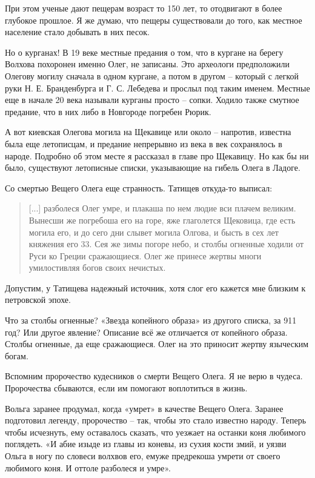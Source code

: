 При этом ученые дают пещерам возраст то 150 лет, то отодвигают в более глубокое прошлое. Я же думаю, что пещеры существовали до того, как местное население стало добывать в них песок. 

Но о курганах! В 19 веке местные предания о том, что в кургане на берегу Волхова похоронен именно Олег, не записаны. Это археологи предположили Олегову могилу сначала в одном кургане, а потом в другом – который с легкой руки Н. Е. Бранденбурга и Г. С. Лебедева и прослыл под таким именем. Местные еще в начале 20 века называли курганы просто – сопки. Ходило также смутное предание, что в них либо в Новгороде погребен Рюрик.

А вот киевская Олегова могила на Щекавице или около – напротив, известна была еще летописцам, и предание непрерывно из века в век сохранялось в народе. Подробно об этом месте я рассказал в главе про Щекавицу. Но как бы ни было, существуют летописные списки, указывающие на гибель Олега в Ладоге.


Со смертью Вещего Олега еще странность. Татищев откуда-то выписал:

\begin{quotation}
[...] разболеся Олег умре, и плакаша по нем людие вси плачем великим. Вынесши же погребоша его на горе, яже глаголется Щековица, где есть могила его, и до сего дни слывет могила Олгова, и бысть в сех лет княжения его 33. Сея же зимы погоре небо, и столбы огненные ходили от Руси ко Греции сражающиеся. Олег же принесе жертвы многи умилостивляя богов своих нечистых.
\end{quotation}

Допустим, у Татищева надежный источник, хотя слог его кажется мне близким к петровской эпохе.

Что за столбы огненные? «Звезда копейного образа» из другого списка, за 911 год? Или другое явление? Описание всё же отличается от копейного образа. Столбы огненные, да еще сражающиеся. Олег на это приносит жертву языческим богам.

Вспомним пророчество кудесников о смерти Вещего Олега. Я не верю в чудеса. Пророчества сбываются, если им помогают воплотиться в жизнь.

Вольга заранее продумал, когда «умрет» в качестве Вещего Олега. Заранее подготовил легенду, пророчество – так, чтобы это стало известно народу. Теперь чтобы исчезнуть, ему оставалось сказать, что уезжает на останки коня любимого поглядеть. «И абие изыде из главы из коневы, из сухия кости змий, и уязви Ольга в ногу по словеси волхвов его, емуже предрекоша умрети от своего любимого коня. И оттоле разболеся и умре».

